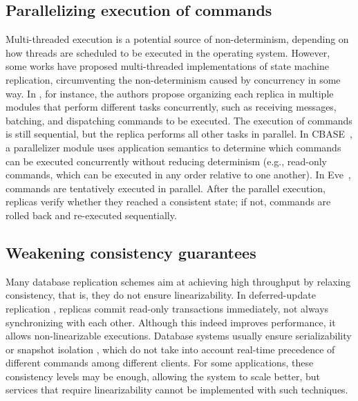\subsection{Parallelizing execution of commands}

Multi-threaded execution is a potential source of non-determinism, depending on
how threads are scheduled to be executed in the operating system. However, some
works have proposed multi-threaded implementations of state machine replication,
circumventing the non-determinism caused by concurrency in some way. In
\cite{santos2013htsmr}, for instance, the authors propose organizing each
replica in multiple modules that perform different tasks concurrently, such as
receiving messages, batching, and dispatching commands to be executed. The
execution of commands is still sequential, but the replica performs all other
tasks in parallel. In CBASE~\cite{Kotla:2004ep}, a parallelizer module uses
application semantics to determine which commands can be executed concurrently
without reducing determinism (e.g., read-only commands, which can be executed in
any order relative to one another). In Eve~\cite{Kapritsos:2012um}, commands are
tentatively executed in parallel. After the parallel execution, replicas verify
whether they reached a consistent state; if not, commands are rolled back and
re-executed sequentially.

\subsection{Weakening consistency guarantees}

Many database replication schemes aim at achieving high throughput by relaxing
consistency, that is, they do not ensure linearizability. In deferred-update
replication \cite{chundi96dur, kobus2013hybrid, sciascia2012sdur, SousaOMP01},
replicas commit read-only transactions immediately, not always synchronizing
with each other. Although this indeed improves performance, it allows
non-linearizable executions. Database systems usually ensure serializability
\cite{BHG87} or snapshot isolation \cite{LinKJPA09}, which do not take into
account real-time precedence of different commands among different clients. For
some applications, these consistency levels may be enough, allowing the system
to scale better, but services that require linearizability cannot be implemented
with such techniques.


